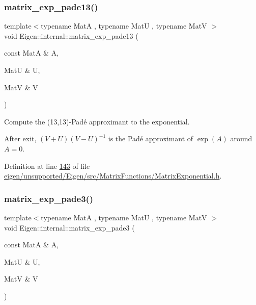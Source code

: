 \mbox{\label{namespace_eigen_1_1internal_ae7d0962a143c96343984440db683905a}} 
\subsubsection{\texorpdfstring{matrix\+\_\+exp\+\_\+pade13()}{matrix\_exp\_pade13()}}
{\footnotesize\ttfamily template$<$typename MatA , typename MatU , typename MatV $>$ \\
void Eigen\+::internal\+::matrix\+\_\+exp\+\_\+pade13 (\begin{DoxyParamCaption}\item[{const MatA \&}]{A,  }\item[{MatU \&}]{U,  }\item[{MatV \&}]{V }\end{DoxyParamCaption})}



Compute the (13,13)-\/\+Pad\'{e} approximant to the exponential. 

After exit, $ (V+U)(V-U)^{-1} $ is the Pad\'{e} approximant of $ \exp(A) $ around $ A = 0 $. 

Definition at line \hyperlink{eigen_2unsupported_2_eigen_2src_2_matrix_functions_2_matrix_exponential_8h_source_l00143}{143} of file \hyperlink{eigen_2unsupported_2_eigen_2src_2_matrix_functions_2_matrix_exponential_8h_source}{eigen/unsupported/\+Eigen/src/\+Matrix\+Functions/\+Matrix\+Exponential.\+h}.

\mbox{\label{namespace_eigen_1_1internal_a7e6cf2e01b6fb376d33b9bb8183e5777}} 
\subsubsection{\texorpdfstring{matrix\+\_\+exp\+\_\+pade3()}{matrix\_exp\_pade3()}}
{\footnotesize\ttfamily template$<$typename MatA , typename MatU , typename MatV $>$ \\
void Eigen\+::internal\+::matrix\+\_\+exp\+\_\+pade3 (\begin{DoxyParamCaption}\item[{const MatA \&}]{A,  }\item[{MatU \&}]{U,  }\item[{MatV \&}]{V }\end{DoxyParamCaption})}



